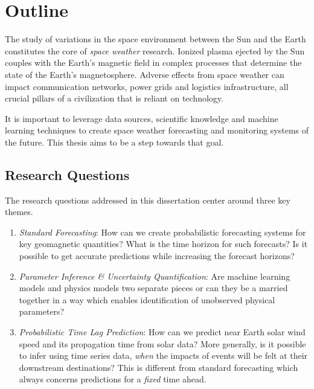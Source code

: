 \chapter{Outline}\label{chapter:Outline}

The study of variations in the space environment between the Sun and the Earth constitutes 
the core of \textit{space weather} research. Ionized plasma ejected by the Sun couples with 
the Earth’s magnetic field in complex processes that determine the state of the Earth's 
magnetosphere. Adverse effects from space weather can impact communication networks, 
power grids and logistics infrastructure, all crucial pillars of a civilization that 
is reliant on technology.

It is important to leverage data sources, scientific knowledge and machine learning 
techniques to create space weather forecasting and monitoring systems of the future. This 
thesis aims to be a step towards that goal. 

\section{Research Questions}

The research questions addressed in this dissertation center around three key themes.

\begin{enumerate}
    \item \textit{Standard Forecasting}: How can we create probabilistic forecasting systems 
    for key geomagnetic quantities? What is the time horizon for such forecasts? Is it possible 
    to get accurate predictions while increasing the forecast horizons?
    
    \item \textit{Parameter Inference \& Uncertainty Quantification}: Are machine learning models 
    and physics models two separate pieces or can they be a married together in a way which enables 
    identification of unobserved physical parameters?  
    
    \item \textit{Probabilistic Time Lag Prediction}: How can we predict near Earth solar wind speed 
    and its propagation time from solar data? More generally, is it possible to infer using time series 
    data, \emph{when} the impacts of events will be felt at their downstream destinations? This is different 
    from standard forecasting which always concerns predictions for a \emph{fixed} time ahead.
\end{enumerate}
    
